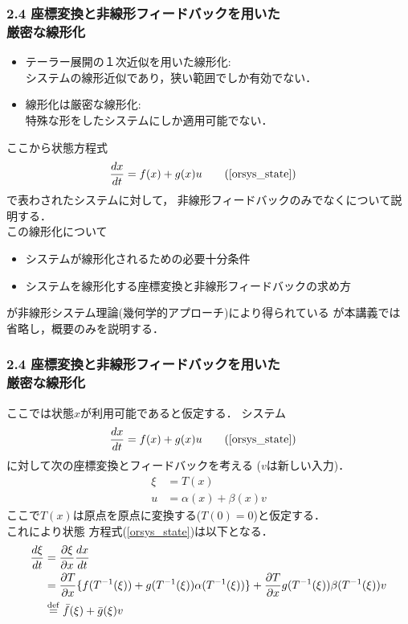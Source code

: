 \begin{frame}[t]
\frametitle{2.4 座標変換と非線形フィードバックを用いた
\\厳密な線形化}
\begin{itemize}
	\item テーラー展開の１次近似を用いた線形化:\\
	システムの線形近似であり，狭い範囲でしか有効でない．
	\item 線形化は厳密な線形化:\\
	特殊な形をしたシステムにしか適用可能でない．
\end{itemize}

ここから状態方程式
\begin{align}
 \frac{dx}{dt} &= f(x) + g(x) u \tag{\ref{orsys_state}}
\end{align}
で表わされたシステムに対して，
非線形フィードバックのみでなくについて説明する．\\
この線形化について
\begin{itemize}
	\item システムが線形化されるための必要十分条件
	\item システムを線形化する座標変換と非線形フィードバックの求め方
\end{itemize}
が非線形システム理論(幾何学的アプローチ)により得られている
が本講義では省略し，概要のみを説明する．
\end{frame}

\begin{frame}[t]
\frametitle{2.4 座標変換と非線形フィードバックを用いた\\
厳密な線形化}
ここでは状態$x$が利用可能であると仮定する．
システム
\begin{align}
 \frac{dx}{dt} &= f(x) + g(x) u \tag{\ref{orsys_state}}
 \end{align}
に対して次の座標変換とフィードバックを考える
($v$は新しい入力)．
\begin{align}
 \xi &= T(x) \label{cord} \\
 u   &= \alpha (x) + \beta (x) v
  \label{feedback}
\end{align}
ここで$T(x)$は原点を原点に変換する($T(0)=0$)と仮定する．\\
これにより状態
方程式(\ref{orsys_state})は以下となる．
\begin{align}
 \frac{d \xi}{dt} 
  &= \frac{\partial \xi}{\partial x} \frac{dx}{dt} \nonumber \\
 &= \frac{\partial T}{\partial x} 
  \{ f(T^{-1}(\xi)) + g(T^{-1}(\xi)) \alpha(T^{-1}(\xi)) \}
  + \frac{\partial T}{\partial x} g(T^{-1}(\xi)) \beta (T^{-1}(\xi)) v \\
 &\stackrel{\rm def}{=} \bar{f}(\xi) + \bar{g}(\xi) v
  \label{feed_state}
\end{align}

\end{frame}

